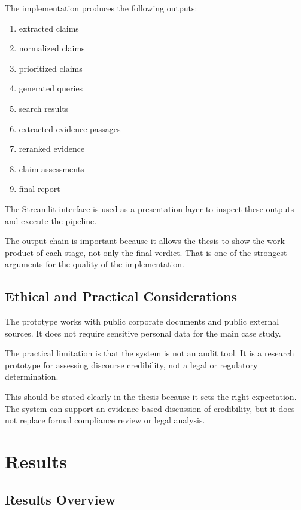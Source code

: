 The implementation produces the following outputs:

\begin{enumerate}
    \item extracted claims
    \item normalized claims
    \item prioritized claims
    \item generated queries
    \item search results
    \item extracted evidence passages
    \item reranked evidence
    \item claim assessments
    \item final report
\end{enumerate}

The Streamlit interface is used as a presentation layer to inspect these outputs and execute the pipeline.

The output chain is important because it allows the thesis to show the work product of each stage, not only the final verdict. That is one of the strongest arguments for the quality of the implementation.

\subsection{Ethical and Practical Considerations}

The prototype works with public corporate documents and public external sources. It does not require sensitive personal data for the main case study.

The practical limitation is that the system is not an audit tool. It is a research prototype for assessing discourse credibility, not a legal or regulatory determination.

This should be stated clearly in the thesis because it sets the right expectation. The system can support an evidence-based discussion of credibility, but it does not replace formal compliance review or legal analysis.

\section{Results}

\subsection{Results Overview}


